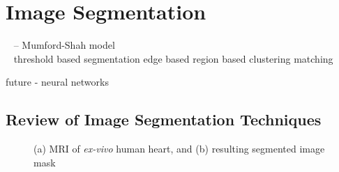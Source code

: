 \chapter{Image Segmentation}
%

~\cite{morel} -- Mumford-Shah model\\
~\cite{mitiche}
threshold based segmentation
edge based
region based
clustering
matching

future - neural networks

\section{Review of Image Segmentation Techniques}
\label{Review of Image Segmentation Techniques}

\begin{figure}[ht]
\centering
{}
%
\caption{(a) MRI of \textit{ex-vivo} human heart, and (b) resulting segmented image mask}
\label{fig:seg}
\end{figure}
